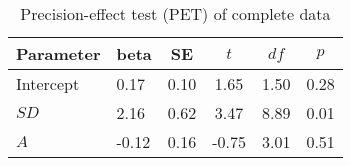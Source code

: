 \begin{table}[ht]
\centering
\caption{Precision-effect test (PET) of complete data} 
\label{tab:PET}
\begingroup\small
\begin{tabular}{llcccc}
  \hline
Parameter & beta & SE & $t$ & $df$ & $p$ \\ 
  \hline
Intercept & 0.17 & 0.10 & 1.65 & 1.50 & 0.28 \\ 
  $SD$ & 2.16 & 0.62 & 3.47 & 8.89 & 0.01 \\ 
  $A$ & -0.12 & 0.16 & -0.75 & 3.01 & 0.51 \\ 
   \hline
\end{tabular}
\endgroup
\end{table}
